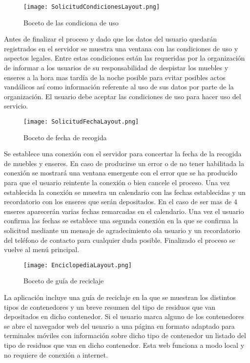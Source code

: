  \begin{figure}[H]
\centering
	\texttt{[image: SolicitudCondicionesLayout.png]} 
\caption{Boceto de las condiciona de uso}
\end{figure}
Antes de finalizar el proceso y dado que los datos del usuario quedarán registrados en el servidor se muestra una ventana con las condiciones de uso y aspectos legales. Entre estas condiciones están las requeridas por la organización de informar a los usuarios de su responsabilidad de despistar los muebles y enseres a la hora mas tardía de la noche posible para evitar posibles actos vandálicos así como información referente al uso de sus datos por parte de la organización. El usuario debe aceptar las condiciones de uso para hacer uso del servicio.

  \begin{figure}[H]
\centering
	\texttt{[image: SolicitudFechaLayout.png]} 
\caption{Boceto de fecha de recogida}
\end{figure}
Se establece una conexión con el servidor para concertar la fecha de la recogida de muebles y enseres. En caso de producirse un error o de no tener habilitada la conexión se mostrará una ventana emergente con el error que se ha producido para que el usuario reintente la conexión o bien cancele el proceso. Una vez establecida la conexión se muestra un calendario con las fechas establecidas  y un recordatorio con los enseres que serán depositados. En el caso de ser mas de 4 enseres aparecerán varias fechas remarcadas en el calendario. Una vez el usuario confirma las fechas se establece una segunda conexión en la que se confirma la solicitud mediante un mensaje de agradecimiento ola usuario y un recordatorio del teléfono de contacto para cualquier duda posible. Finalizado el proceso se vuelve al menú principal. 

  \begin{figure}[H]
\centering
	\texttt{[image: EnciclopediaLayout.png]} 
\caption{Boceto de guía de reciclaje}
\end{figure}
La aplicación incluye una guía de reciclaje en la que se muestran los distintos tipos de contenedores y un breve resumen del tipo de residuos que van depositados en dicho contenedor. Si el usuario marca alguno de los contenedores se abre el navegador web del usuario a una página en formato adaptado para terminales móviles con información sobre dicho tipo de contenedor un listado del tipo de residuos que van en dicho contenedor. Esta web funciona a modo local y no requiere de conexión a internet.

